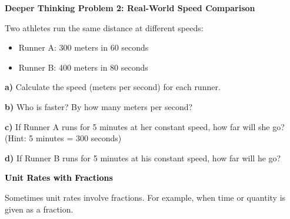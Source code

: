 \documentclass[12pt, letterpaper, fleqn]{article}
\begin{document}
\begin{tcolorbox}[colback=white!15, colframe=black, boxrule=1.5pt, arc=4mm, left=6mm, right=6mm, top=5mm, bottom=5mm]

\textbf{Deeper Thinking Problem 2: Real-World Speed Comparison}

\medskip

\noindent
Two athletes run the same distance at different speeds:
\begin{itemize}
    \item Runner A: 300 meters in 60 seconds
    \item Runner B: 400 meters in 80 seconds
\end{itemize}

\noindent
\textbf{a)} Calculate the speed (meters per second) for each runner.

\vspace{3.5cm}

\noindent
\textbf{b)} Who is faster? By how many meters per second?

\vspace{3.5cm}

\noindent
\textbf{c)} If Runner A runs for 5 minutes at her constant speed, how far will she go? (Hint: 5 minutes = 300 seconds)

\vspace{3.5cm}

\noindent
\textbf{d)} If Runner B runs for 5 minutes at his constant speed, how far will he go?

\vspace{3.5cm}

\end{tcolorbox}

\newpage

\begin{tcolorbox}[colback=customteal!20]
\large\textcolor{black}{\textbf{Unit Rates with Fractions}}
\end{tcolorbox}

\noindent
Sometimes unit rates involve fractions. For example, when time or quantity is given as a fraction.

\vspace{3mm}
\end{document}
